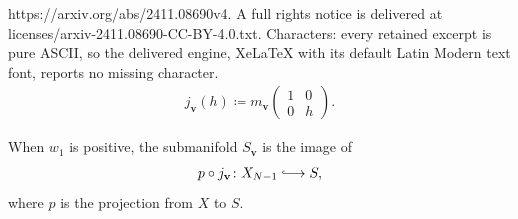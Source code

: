 \documentclass[10pt,a4paper]{amsart}
\newcommand{\hooklongrightarrow}{\lhook\joinrel\longrightarrow}
\newcommand{\vbf}{\mathbf{v}}
\begin{document}
https://arxiv.org/abs/2411.08690v4. A full rights notice is delivered at licenses/arxiv-2411.08690-CC-BY-4.0.txt. Characters: every retained excerpt is pure ASCII, so the delivered engine, XeLaTeX with its default Latin Modern text font, reports no missing character.
\begin{align} \label{jemb2}
j_{\vbf}(h) \coloneqq m_\vbf \begin{pmatrix}1 & 0 \\ 0 & h\end{pmatrix}.
\end{align}

\begin{prop} When $w_1$ is positive, the submanifold $S_\vbf$ is the image of \begin{align}
    p \circ j_\vbf \colon X_{N-1} \hooklongrightarrow S, 
\end{align}
where $p$ is the projection from $X$ to $S$.
\end{prop}
\end{document}
